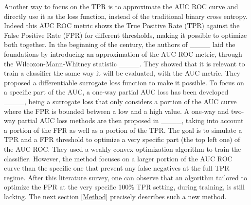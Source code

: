Another way to focus on the TPR is to approximate the AUC ROC curve and directly use it as the loss function, instead of the traditional binary cross entropy. Indeed this AUC ROC metric shows the True Positive Rate (TPR) against the False Positive Rate (FPR) for different thresholds, making it possible to optimize both together. In the beginning of the  century, the authors of ____ laid the foundations by introducing an approximation of the AUC ROC metric, through the Wilcoxon-Mann-Whitney statistic ____. They showed that it is relevant to train a classifier the same way it will be evaluated, with the AUC metric. They proposed a differentiable surrogate loss function to make it possible. To focus on a specific part of the AUC, a one-way partial AUC loss has been developed ____, being a surrogate loss that only considers a portion of the AUC curve where the FPR is bounded between a low and a high value. A one-way and two-way partial AUC loss methods are then proposed in ____, taking into account a portion of the FPR as well as a portion of the TPR. The goal is to simulate a TPR and a FPR threshold to optimize a very specific part (the top left one) of the AUC ROC. They used a weakly convex optimization algorithm to train the classifier. However, the method focuses on a larger portion of the AUC ROC curve than the specific one that prevent any false negatives at the full TPR regime. After this literature survey, one can observe that an algorithm tailored to optimize the FPR at the very specific 100\% TPR setting, during training, is still lacking. The next section \ref{Method} precisely describes such a new method.